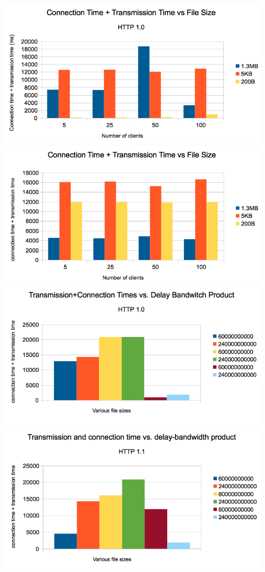 \documentclass[10pt]{report}
\begin{document}
\includegraphics[scale=0.6]{images/conntran_fs_10.png}\\
\includegraphics[scale=0.6]{images/conntran_fs_11.png}\\
\includegraphics[scale=0.6]{images/pngconntran_del_10.png}\\
\includegraphics[scale=0.6]{images/pngconntran_del_11.png}\\
\end{document}

